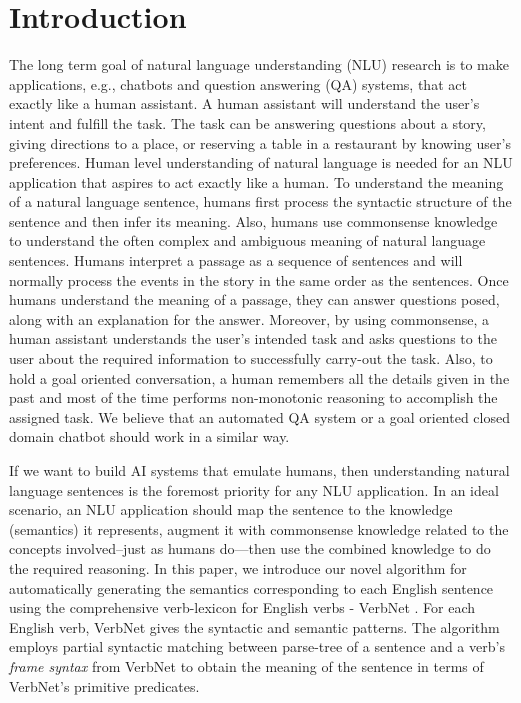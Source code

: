 \documentclass[letterpaper]{article}
\begin{document}
\section{Introduction}

The long term goal of natural language understanding (NLU) research is to make applications, e.g., chatbots and question answering (QA) systems, that act exactly like a human assistant. A human assistant will understand the user's intent and fulfill the task. The task can be answering questions about a story, giving directions to a place, or  reserving a table in a restaurant by knowing user's preferences. Human level understanding of natural language is needed for an NLU application that aspires to act exactly like a human. To understand the meaning of a natural language sentence, humans first process the syntactic structure of the sentence and then infer its meaning. Also, humans use commonsense knowledge to understand the often complex and ambiguous meaning of natural language sentences. Humans interpret a passage as a sequence of sentences and will normally process the events in the story in the same order as the sentences. Once humans understand the meaning of a passage, they can answer questions posed, along with an explanation for the answer. Moreover, by using commonsense, a human assistant understands the user's intended task and asks questions to the user about the required information to successfully carry-out the task. Also, to hold a goal oriented conversation, a human remembers all the details given in the past and most of the time performs non-monotonic reasoning to accomplish the assigned task. We believe that an automated QA system or a goal oriented closed domain chatbot should work in a similar way. 

If we want to build AI systems that emulate humans, then understanding natural language sentences is the foremost priority for any NLU application. In an ideal scenario, an NLU application should map the sentence to the knowledge (semantics) it represents, augment it with commonsense knowledge related to the concepts involved--just as humans do---then use the combined knowledge to do the required reasoning. In this paper, we introduce our novel algorithm for automatically generating the semantics corresponding to each English sentence using the comprehensive verb-lexicon for English verbs - VerbNet \cite{vn}. For each English verb, VerbNet gives the syntactic and semantic patterns. The algorithm employs partial syntactic matching between parse-tree of a sentence and a verb's \textit{frame syntax} from VerbNet to obtain the meaning of the sentence in terms of VerbNet's primitive predicates.
\end{document}
